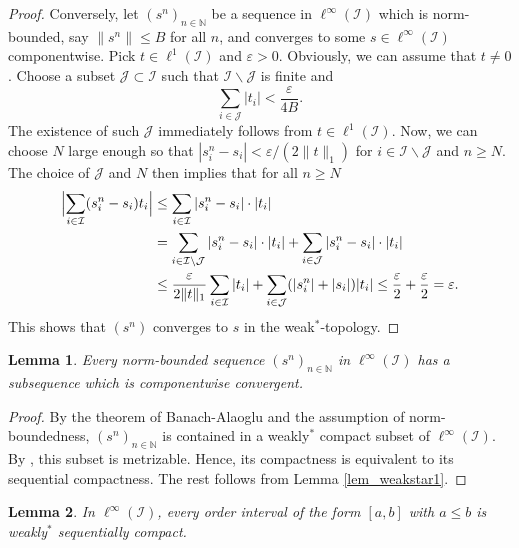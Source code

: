 \documentclass[10pt, oneside, a4paper]{article}
\newcommand{\N}{\mathbb{N}}
\newcommand{\ep}{\varepsilon}
\newcommand{\IC}{\mathcal{I}}
\newcommand{\JC}{\mathcal{J}}
\newtheorem{lemma}{Lemma}[section]
\begin{document}
\begin{proof}
Conversely, let $(s^n)_{n\in\N}$ be a sequence in $\ell^{\infty}(\IC)$ which is norm-bounded, say $\|s^n\| \leq B$ for all $n$, and converges to some $s \in \ell^{\infty}(\IC)$ componentwise. Pick $t \in \ell^1(\IC)$ and $\ep > 0$. Obviously, we can assume that $t \neq 0$. Choose a subset $\JC \subset \IC$ such that $\IC \backslash \JC$ is finite and%
\begin{equation*}
  \sum_{i \in \JC} |t_i| < \frac{\ep}{4B}.%
\end{equation*}
The existence of such $\JC$ immediately follows from $t \in \ell^1(\IC)$. Now, we can choose $N$ large enough so that $|s^n_i - s_i| < \ep / (2\|t\|_1)$ for $i \in \IC \backslash \JC$ and $n \geq N$. The choice of $\JC$ and $N$ then implies that for all $n \geq N$%
\begin{align*}
  \Bigl|\sum_{i \in \IC}(s^n_i - s_i)t_i\Bigr| &\leq \sum_{i \in \IC}|s^n_i - s_i| \cdot |t_i| \\
	                                             &= \sum_{i \in \IC \backslash \JC} |s^n_i - s_i| \cdot |t_i| + \sum_{i \in \JC} |s^n_i - s_i| \cdot |t_i| \\
																					     &\leq \frac{\ep}{2\|t\|_1} \sum_{i \in \IC} |t_i| + \sum_{i \in \JC} (|s^n_i| + |s_i|) |t_i| \leq 
																							\frac{\ep}{2} + \frac{\ep}{2} = \ep.%
\end{align*}
This shows that $(s^n)$ converges to $s$ in the weak$^*$-topology.
\end{proof}

\begin{lemma}\label{lem_weakstar2}
Every norm-bounded sequence $(s^n)_{n\in\N}$ in $\ell^{\infty}(\IC)$ has a subsequence which is componentwise convergent.
\end{lemma}

\begin{proof}
By the theorem of Banach-Alaoglu and the assumption of norm-boundedness, $(s^n)_{n\in\N}$ is contained in a weakly$^*$ compact subset of $\ell^{\infty}(\IC)$. By \cite[Cor.~2.6.20]{Meg}, this subset is metrizable. Hence, its compactness is equivalent to its sequential compactness. The rest follows from Lemma \ref{lem_weakstar1}. 
\end{proof}

\begin{lemma}\label{lem_weakstar3}
In $\ell^{\infty}(\IC)$, every order interval of the form $[a,b]$ with $a \leq b$ is weakly$^*$ sequentially compact.
\end{lemma}
\end{document}
